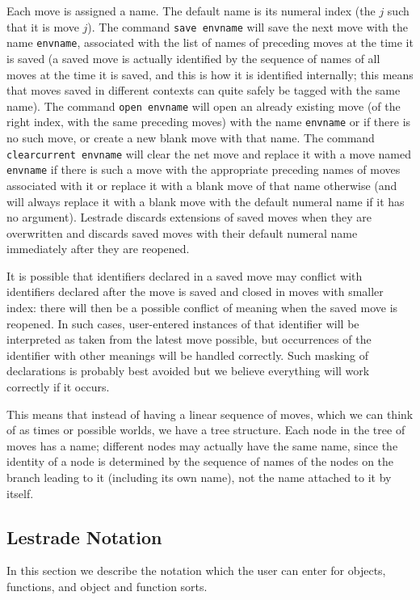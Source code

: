 \documentclass[12pt]{article}
\begin{document}
Each move is assigned a name.  The default name is its numeral index (the $j$ such that it is move $j$).  The command {\tt save envname} will save the next move with the name
{\tt envname}, associated with the list of names of preceding moves at the time it is saved (a saved move is actually identified by the sequence of names of all moves at the time it is saved, and this is how it is identified internally;  this means that moves saved in different contexts can quite safely be tagged with the same name).  The command {\tt open envname} will open an already existing move (of the right index, with the same preceding moves) with the name
{\tt envname} or if there is no such move, or create a new blank move with that name.  The command {\tt clearcurrent envname} will clear the net move and replace it with a move named {\tt envname} if there is such a move with the appropriate preceding names of moves associated with it or replace it with a blank move of that name otherwise (and will always replace it with a blank move with the default numeral name if it has no argument).   Lestrade discards extensions of saved moves when they are overwritten and discards saved moves with their default numeral name immediately after they are reopened.

It is possible that identifiers declared in a saved move may conflict with identifiers declared after the move is saved and closed in moves with smaller index: there will then be a possible conflict of meaning when the saved move is reopened.  In such cases, user-entered instances of that identifier will be interpreted as taken from the latest move possible, but occurrences of the identifier with other meanings will be handled correctly.  Such masking of declarations is probably best avoided but we believe everything will work correctly if it occurs.

This means that instead of having a linear sequence of moves, which we can think of as times or possible worlds, we have a tree structure.  Each node in the tree of moves has a name;  different nodes may actually have the same name, since the identity of a node is determined by the sequence of names of the nodes on the branch leading to it (including its own name), not the name attached to it by itself. 


\subsection{Lestrade Notation}

In this section we describe the notation which the user can enter for objects, functions, and object and function sorts.
\end{document}
